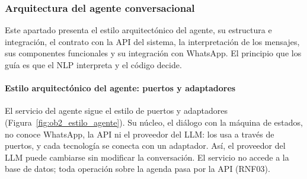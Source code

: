 \subsubsection{Arquitectura del agente conversacional}

Este apartado presenta el estilo arquitectónico del agente, su estructura e integración, el contrato con la API del sistema, la interpretación de los mensajes, sus componentes funcionales y su integración con WhatsApp. El principio que los guía es que el NLP interpreta y el código decide.

\paragraph{Estilo arquitectónico del agente: puertos y adaptadores}

El servicio del agente sigue el estilo de puertos y adaptadores \cite{cockburn2005hexagonal} (Figura~\ref{fig:ob2_estilo_agente}). Su núcleo, el diálogo con la máquina de estados, no conoce WhatsApp, la API ni el proveedor del LLM: los usa a través de puertos, y cada tecnología se conecta con un adaptador. Así, el proveedor del LLM puede cambiarse sin modificar la conversación. El servicio no accede a la base de datos; toda operación sobre la agenda pasa por la API (RNF03).

